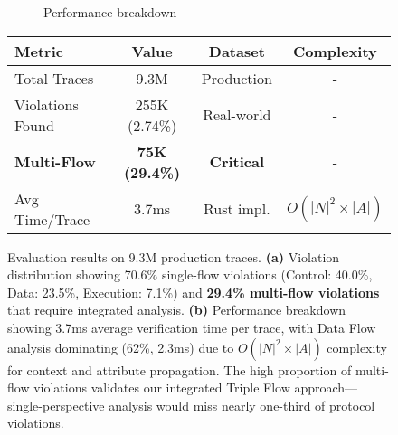 \begin{figure}[t]
\begin{subfigure}[b]{0.48\columnwidth}
\caption{Performance breakdown}
\label{fig:eval-performance}
\end{subfigure}

\vspace{0.3cm}

\begin{center}
\begin{tabular}{|l|c|c|c|}
\hline
\textbf{Metric} & \textbf{Value} & \textbf{Dataset} & \textbf{Complexity} \\
\hline
Total Traces & 9.3M & Production & - \\
Violations Found & 255K (2.74\%) & Real-world & - \\
\textbf{Multi-Flow} & \textbf{75K (29.4\%)} & \textbf{Critical} & - \\
Avg Time/Trace & 3.7ms & Rust impl. & $O(|N|^2 \times |A|)$ \\
\hline
\end{tabular}
\end{center}

\caption{Evaluation results on 9.3M production traces. \textbf{(a)} Violation distribution showing 70.6\% single-flow violations (Control: 40.0\%, Data: 23.5\%, Execution: 7.1\%) and \textbf{29.4\% multi-flow violations} that require integrated analysis. \textbf{(b)} Performance breakdown showing 3.7ms average verification time per trace, with Data Flow analysis dominating (62\%, 2.3ms) due to $O(|N|^2 \times |A|)$ complexity for context and attribute propagation. The high proportion of multi-flow violations validates our integrated Triple Flow approach—single-perspective analysis would miss nearly one-third of protocol violations.}
\label{fig:evaluation}
\end{figure}

